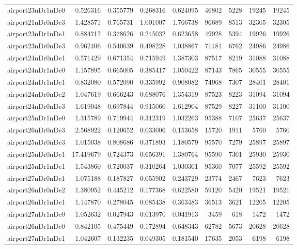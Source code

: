 \documentclass[../../../thesis.tex]{subfiles}
\begin{document}
\begin{longtable}{|l|r|r|r|r|r|r|r|r|}
airport23nDr1nDe0 & 0.526316 & 0.355779 & 0.268316 & 0.624095 & 46802 & 5228 & 19245 & 19245 \\
airport21nDr0nDe3 & 1.428571 & 0.765731 & 1.001007 & 1.766738 & 96689 & 8513 & 32305 & 32305 \\
airport23nDr1nDe1 & 0.884712 & 0.378626 & 0.245032 & 0.623658 & 49928 & 5394 & 19926 & 19926 \\
airport23nDr0nDe3 & 0.962406 & 0.540639 & 0.498228 & 1.038867 & 71481 & 6762 & 24986 & 24986 \\
airport24nDr0nDe1 & 0.571429 & 0.671354 & 0.715949 & 1.387303 & 87517 & 8219 & 31088 & 31088 \\
airport24nDr1nDe0 & 1.157895 & 0.665005 & 0.385417 & 1.050422 & 87143 & 7865 & 30555 & 30555 \\
airport24nDr1nDe1 & 0.832080 & 0.572090 & 0.335992 & 0.908082 & 74968 & 7307 & 28401 & 28401 \\
airport24nDr0nDe2 & 1.047619 & 0.666243 & 0.688076 & 1.354319 & 87523 & 8223 & 31094 & 31094 \\
airport24nDr0nDe3 & 1.619048 & 0.697844 & 0.915060 & 1.612904 & 87529 & 8227 & 31100 & 31100 \\
airport25nDr1nDe0 & 1.315789 & 0.719944 & 0.312319 & 1.032263 & 95388 & 7107 & 25637 & 25637 \\
airport26nDr0nDe3 & 2.568922 & 0.120652 & 0.033006 & 0.153658 & 15720 & 1911 & 5760 & 5760 \\
airport25nDr0nDe3 & 1.015038 & 0.808686 & 0.371893 & 1.180579 & 95570 & 7279 & 25897 & 25897 \\
airport25nDr0nDe1 & 17.419679 & 0.724373 & 0.656391 & 1.380764 & 95590 & 7301 & 25930 & 25930 \\
airport25nDr1nDe1 & 1.543860 & 0.720037 & 0.310264 & 1.030301 & 95360 & 7077 & 25592 & 25592 \\
airport27nDr0nDe1 & 1.075188 & 0.187827 & 0.055902 & 0.243729 & 23774 & 2467 & 7623 & 7623 \\
airport26nDr0nDe2 & 1.380952 & 0.445212 & 0.177368 & 0.622580 & 59120 & 5420 & 19521 & 19521 \\
airport26nDr1nDe1 & 1.147870 & 0.278045 & 0.085438 & 0.363483 & 36513 & 3621 & 12205 & 12205 \\
airport27nDr1nDe0 & 1.052632 & 0.027943 & 0.013970 & 0.041913 & 3459 & 618 & 1472 & 1472 \\
airport26nDr1nDe0 & 0.842105 & 0.475449 & 0.172894 & 0.648343 & 62782 & 5673 & 20628 & 20628 \\
airport27nDr1nDe1 & 1.042607 & 0.132235 & 0.049305 & 0.181540 & 17635 & 2053 & 6198 & 6198 \\

\end{longtable}
\end{document}
